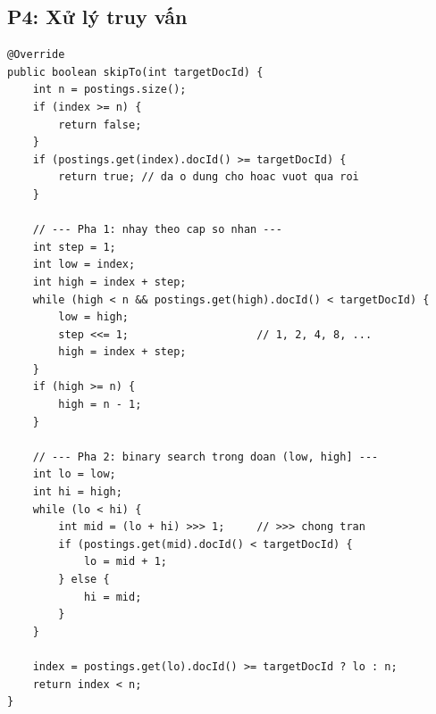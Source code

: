 \documentclass[9pt,twocolumn,a4paper]{extarticle}
\newcommand{\code}[1]{\texttt{#1}}
\begin{document}
\subsection{P4: Xử lý truy vấn}
\begin{minipage}{\linewidth}
\begin{lstlisting}[caption={\code{index/ArrayPostingCursor.java}, \code{skipTo}: nhảy theo cấp số nhân rồi tìm nhị phân},label={lst:skipto}]
@Override
public boolean skipTo(int targetDocId) {
    int n = postings.size();
    if (index >= n) {
        return false;
    }
    if (postings.get(index).docId() >= targetDocId) {
        return true; // da o dung cho hoac vuot qua roi
    }

    // --- Pha 1: nhay theo cap so nhan ---
    int step = 1;
    int low = index;
    int high = index + step;
    while (high < n && postings.get(high).docId() < targetDocId) {
        low = high;
        step <<= 1;                    // 1, 2, 4, 8, ...
        high = index + step;
    }
    if (high >= n) {
        high = n - 1;
    }

    // --- Pha 2: binary search trong doan (low, high] ---
    int lo = low;
    int hi = high;
    while (lo < hi) {
        int mid = (lo + hi) >>> 1;     // >>> chong tran
        if (postings.get(mid).docId() < targetDocId) {
            lo = mid + 1;
        } else {
            hi = mid;
        }
    }

    index = postings.get(lo).docId() >= targetDocId ? lo : n;
    return index < n;
}
\end{lstlisting}
\end{minipage}
\par\vspace{4pt}
\end{document}
